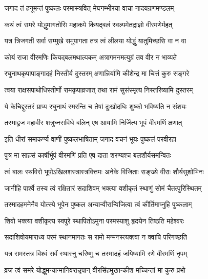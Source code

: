 \twolineshloka
{जगाद तं हनूमन्तं पुष्कलः परमास्त्रवित्}
{मेघगम्भीरया वाचा नादयन्रणमण्डलम्}%


\twolineshloka
{कथं त्वं समरे योद्धुमागतोसि महाकपे}
{कियद्बलं स्वल्पमेतद्राज्ञो वीरमणेर्महत्}%

\twolineshloka
{यत्र त्रिजगती सर्वा सम्मुखे समुपागता}
{तत्र त्वं लीलया योद्धुं यातुमिच्छसि वा न वा}%

\twolineshloka
{कोयं राजा वीरमणिः कियद्बलमथाल्पकम्}
{अत्रागमनमत्युग्रं तव वीर न भाव्यते}%

\twolineshloka
{रघुनाथकृपापाङ्गादहं निस्तीर्य दुस्तरम्}
{क्षणान्निर्यामि कीशेन्द्र मा चित्तं कुरु सङ्गरे}%

\twolineshloka
{त्वया राक्षसपाथोधिस्तीर्णो रामकृपाव्रजात्}
{तथा रामं सुसंस्मृत्य निस्तरिष्यामि दुस्तरम्}%

\twolineshloka
{ये केचिद्दुस्तरं प्राप्य रघुनाथं स्मरन्ति च}
{तेषां दुःखोदधिः शुष्को भविष्यति न संशयः}%

\twolineshloka
{तस्माद्व्रज महावीर शत्रुघ्नसविधे बलिन्}
{एष आयामि निर्जित्य भूपं वीरमणिं क्षणात्}%


\twolineshloka
{इति धीरां समाकर्ण्य वाणीं पुष्कलभाषिताम्}
{जगाद वचनं भूयः पुष्कलं परवीरहा}%


\twolineshloka
{पुत्र मा साहसं कार्षीर्भूपं वीरमणिं प्रति}
{एष दाता शरण्यश्च बलशौर्यसमन्वितः}%

\twolineshloka
{त्वं बालः स्थविरो भूपोऽखिलशस्त्रास्त्रवित्तमः}
{अनेके विजिताः सङ्ख्ये वीराः शौर्यसुशोभिनः}%

\twolineshloka
{जानीहि पार्श्वे तस्य त्वं रक्षितारं सदाशिवम्}
{भक्त्या वशीकृतं स्थाणुं सोमं चैतत्पुरिस्थितम्}%

\twolineshloka
{तस्मादहमनेनैव योत्स्ये भूपेन पुष्कल}
{अन्यान्वीरान्विजित्वा त्वं कीर्तिमाप्नुहि पुष्कलाम्}%


\twolineshloka
{शिवो भक्त्या वशीकृत्य स्वपुरे स्थापितोऽमुना}
{परमस्याशु हृदयेन तिष्ठति महेश्वरः}%

\twolineshloka
{सदाशिवोयमाराध्य परमं स्थानमागतः}
{स रामो मन्मनस्त्यक्त्वा न क्वापि परिगच्छति}%

\twolineshloka
{यत्र रामस्तत्र विश्वं सर्वं स्थास्नु चरिष्णु च}
{तस्मादहं जयिष्यामि रणे वीरमणिं नृपम्}%

\twolineshloka
{व्रज त्वं समरे योद्धुमन्यान्मानिवरान्नृपान्}
{वीरसिंहमुखान्कीश मच्चिन्तां मा कुरु प्रभो}%

